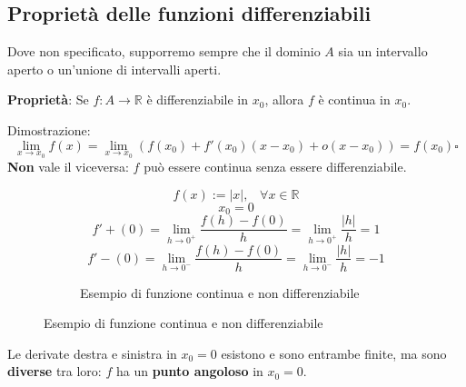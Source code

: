 \documentclass[a4paper]{article}
\theoremstyle{break}
\theoremstyle{break}
\theoremstyle{break}
\theoremstyle{break}
\begin{document}
\subsection{Proprietà delle funzioni differenziabili}
Dove non specificato, supporremo sempre che il dominio \( A \)  sia un intervallo
aperto o un'unione di intervalli aperti.

\textbf{Proprietà}: Se \( f:A \to \mathbb{R} \) è differenziabile in \( x_0 \), allora
\( f \) è continua in \( x_0 \).

Dimostrazione:
\[
	\lim_{x \to x_0} f(x) = \lim_{x \to x_0} (f(x_0)+f'(x_0)(x-x_0)+o(x-x_0)) = f(x_0) \square
\]
\textbf{Non} vale il viceversa: \( f \) può essere continua senza essere differenziabile.
\begin{figure}[H]
	\begin{example}
		\[
			f(x):= |x|,\;\;\; \forall x \in \mathbb{R}
		\]
		\[
			x_0 = 0
		\]
		\[
			f'+(0)=\lim_{h \to 0^+} \frac{f(h)-f(0)}{h} = \lim_{h \to 0^+} \frac{|h|}{h} = 1
		\]
		\[
			f'-(0)=\lim_{h \to 0^-} \frac{f(h)-f(0)}{h} = \lim_{h \to 0^-} \frac{|h|}{h} = -1
		\]
 		\begin{figure}[H]
			\begin{center}
			\end{center}
      \caption{Esempio di funzione continua e non differenziabile}
		\end{figure}

	\end{example}
\end{figure}
Le derivate destra e sinistra in \( x_0 = 0 \) esistono e sono entrambe finite, ma sono
\textbf{diverse} tra loro: \( f \) ha un \textbf{punto angoloso} in \( x_0=0 \).
\end{document}
